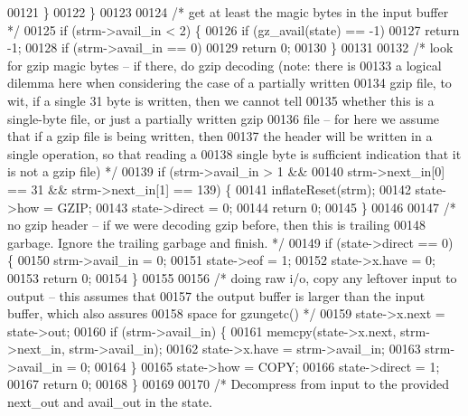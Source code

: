 \begin{DoxyCode}
00121         \}
00122     \}
00123 
00124     \textcolor{comment}{/* get at least the magic bytes in the input buffer */}
00125     \textcolor{keywordflow}{if} (strm->avail\_in < 2) \{
00126         \textcolor{keywordflow}{if} (gz\_avail(state) == -1)
00127             \textcolor{keywordflow}{return} -1;
00128         \textcolor{keywordflow}{if} (strm->avail\_in == 0)
00129             \textcolor{keywordflow}{return} 0;
00130     \}
00131 
00132     \textcolor{comment}{/* look for gzip magic bytes -- if there, do gzip decoding (note: there is}
00133 \textcolor{comment}{       a logical dilemma here when considering the case of a partially written}
00134 \textcolor{comment}{       gzip file, to wit, if a single 31 byte is written, then we cannot tell}
00135 \textcolor{comment}{       whether this is a single-byte file, or just a partially written gzip}
00136 \textcolor{comment}{       file -- for here we assume that if a gzip file is being written, then}
00137 \textcolor{comment}{       the header will be written in a single operation, so that reading a}
00138 \textcolor{comment}{       single byte is sufficient indication that it is not a gzip file) */}
00139     \textcolor{keywordflow}{if} (strm->avail\_in > 1 &&
00140             strm->next\_in[0] == 31 && strm->next\_in[1] == 139) \{
00141         inflateReset(strm);
00142         state->how = GZIP;
00143         state->direct = 0;
00144         \textcolor{keywordflow}{return} 0;
00145     \}
00146 
00147     \textcolor{comment}{/* no gzip header -- if we were decoding gzip before, then this is trailing}
00148 \textcolor{comment}{       garbage.  Ignore the trailing garbage and finish. */}
00149     \textcolor{keywordflow}{if} (state->direct == 0) \{
00150         strm->avail\_in = 0;
00151         state->eof = 1;
00152         state->x.have = 0;
00153         \textcolor{keywordflow}{return} 0;
00154     \}
00155 
00156     \textcolor{comment}{/* doing raw i/o, copy any leftover input to output -- this assumes that}
00157 \textcolor{comment}{       the output buffer is larger than the input buffer, which also assures}
00158 \textcolor{comment}{       space for gzungetc() */}
00159     state->x.next = state->out;
00160     \textcolor{keywordflow}{if} (strm->avail\_in) \{
00161         memcpy(state->x.next, strm->next\_in, strm->avail\_in);
00162         state->x.have = strm->avail\_in;
00163         strm->avail\_in = 0;
00164     \}
00165     state->how = COPY;
00166     state->direct = 1;
00167     \textcolor{keywordflow}{return} 0;
00168 \}
00169 
00170 \textcolor{comment}{/* Decompress from input to the provided next\_out and avail\_out in the state.}

\end{DoxyCode}
